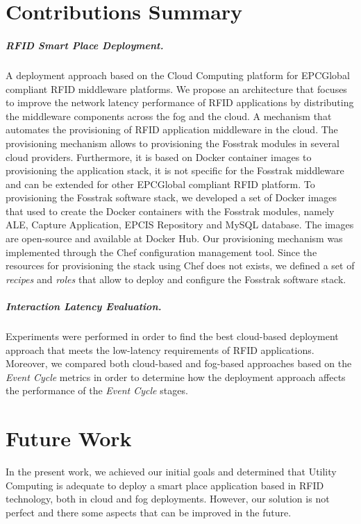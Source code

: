 \section{Contributions Summary}
\label{sec:contributions}

\subparagraph{RFID Smart Place Deployment.}
\label{subp:rfid_smart_place_architecture}
A deployment approach based on the Cloud Computing platform for EPCGlobal compliant \gls{RFID}
middleware platforms. We propose an architecture that focuses to improve the network latency
performance of \gls{RFID} applications by distributing the middleware components across the fog and
the cloud.
%
A mechanism that automates the provisioning of \gls{RFID} application middleware in the cloud.
The provisioning mechanism allows to provisioning the Fosstrak modules in several cloud
providers. Furthermore, it is based on Docker container images to provisioning the application
stack, it is not specific for the Fosstrak middleware and can be extended for other EPCGlobal
compliant \gls{RFID} platform.
%
To provisioning the Fosstrak software stack, we developed a set of Docker images that used to
create the Docker containers with the Fosstrak modules, namely \gls{ALE}, Capture Application,
\gls{EPCIS} Repository and MySQL database. The images are open-source and available at
Docker Hub.
%
Our provisioning mechanism was implemented through the Chef configuration management tool. Since the
resources for provisioning the stack using Chef does not exists, we defined a set of \textit{recipes}
and \textit{roles} that allow to deploy and configure the Fosstrak software stack.

\subparagraph{Interaction Latency Evaluation.}
\label{subp:event_latency_performance_eval}
Experiments were performed in order to find the best cloud-based deployment approach that meets the
low-latency requirements of \gls{RFID} applications. Moreover, we compared both cloud-based and fog-based
approaches based on the \textit{Event Cycle} metrics in order to determine how the deployment
approach affects the performance of the \textit{Event Cycle} stages.

\section{Future Work}
\label{sec:future_work}
In the present work, we achieved our initial goals and determined that Utility Computing is adequate
to deploy a smart place application based in \gls{RFID} technology, both in cloud and fog deployments.
However, our solution is not perfect and there some aspects that can be improved in the future.

